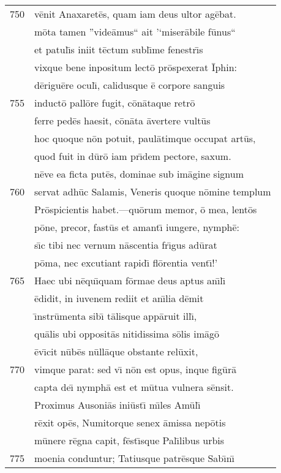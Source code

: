 \documentclass[paper=6in:9in,pagesize=pdftex,
               headinclude=on,footinclude=on,12pt]{scrbook}
\begin{document}
\begin{longtable}[p]{ r l }
750 & v\=enit Anaxaret\=es, quam iam deus ultor ag\=ebat.\\ 
 & m\=ota tamen ''vide\=amus`` ait '`miser\=abile f\=unus``\\ 
 & et patul\={\i}s iniit t\=ectum subl\={\i}me fenestr\={\i}s\\ 
 & vixque bene inpositum lect\=o pr\=ospexerat \=Iphin:\\ 
 & d\=erigu\=ere ocul\={\i}, calidusque \=e corpore sanguis\\ 
755 & induct\=o pall\=ore fugit, c\=on\=ataque retr\=o\\ 
 & ferre ped\=es haesit, c\=on\=ata \=avertere vult\=us\\ 
 & hoc quoque n\=on potuit, paul\=atimque occupat art\=us,\\ 
 & quod fuit in d\=ur\=o iam pr\={\i}dem pectore, saxum.\\ 
 & n\=eve ea ficta put\=es, dominae sub im\=agine signum\\ 
760 & servat adh\=uc Salamis, Veneris quoque n\=omine templum\\ 
 & Pr\=ospicientis habet.—qu\=orum memor, \=o mea, lent\=os\\ 
 & p\=one, precor, fast\=us et amant\={\i} iungere, nymph\=e:\\ 
 & s\={\i}c tibi nec vernum n\=ascentia fr\={\i}gus ad\=urat\\ 
 & p\=oma, nec excutiant rapid\={\i} fl\=orentia vent\={\i}!'\\ 
765 & \indent Haec ubi n\=equ\={\i}quam f\=ormae deus aptus an\={\i}l\={\i}\\ 
 & \=edidit, in iuvenem rediit et an\={\i}lia d\=emit\\ 
 & \={\i}nstr\=umenta sib\={\i} t\=alisque app\=aruit ill\={\i},\\ 
 & qu\=alis ubi opposit\=as nitidissima s\=olis im\=ag\=o\\ 
 & \=ev\={\i}cit n\=ub\=es n\=ull\=aque obstante rel\=uxit,\\ 
770 & vimque parat: sed v\={\i} n\=on est opus, inque fig\=ur\=a\\ 
 & capta de\={\i} nymph\=a est et m\=utua vulnera s\=ensit.\\ 
 & \indent Proximus Ausoni\=as ini\=ust\={\i} m\={\i}les Am\=ul\={\i}\\ 
 & r\=exit op\=es, Numitorque senex \=amissa nep\=otis\\ 
 & m\=unere r\=egna capit, f\=est\={\i}sque Pal\={\i}libus urbis\\ 
775 & moenia conduntur; Tatiusque patr\=esque Sab\={\i}n\={\i}\\ 

\end{longtable}
\end{document}
